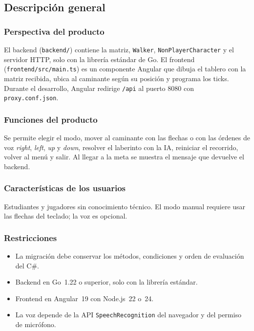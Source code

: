 \documentclass[12pt,a4paper]{article}
\begin{document}
\subsection{Descripción general}

\subsubsection{Perspectiva del producto}
El backend (\texttt{backend/}) contiene la matriz, \texttt{Walker},
\texttt{NonPlayerCharacter} y el servidor HTTP, solo con la librería estándar de
Go. El frontend (\texttt{frontend/src/main.ts}) es un componente Angular que
dibuja el tablero con la matriz recibida, ubica al caminante según su posición y
programa los ticks. Durante el desarrollo, Angular redirige \texttt{/api} al
puerto 8080 con \texttt{proxy.conf.json}.

\subsubsection{Funciones del producto}
Se permite elegir el modo, mover al caminante con las flechas o con las órdenes de
voz \emph{right}, \emph{left}, \emph{up} y \emph{down}, resolver el laberinto con
la IA, reiniciar el recorrido, volver al menú y salir. Al llegar a la meta se
muestra el mensaje que devuelve el backend.

\subsubsection{Características de los usuarios}
Estudiantes y jugadores sin conocimiento técnico. El modo manual requiere usar
las flechas del teclado; la voz es opcional.

\subsubsection{Restricciones}
\begin{itemize}
  \item La migración debe conservar los métodos, condiciones y orden de evaluación del C\#.
  \item Backend en Go~1.22 o superior, solo con la librería estándar.
  \item Frontend en Angular~19 con Node.js~22 o~24.
  \item La voz depende de la API \texttt{SpeechRecognition} del navegador y del permiso de micrófono.
\end{itemize}
\end{document}
